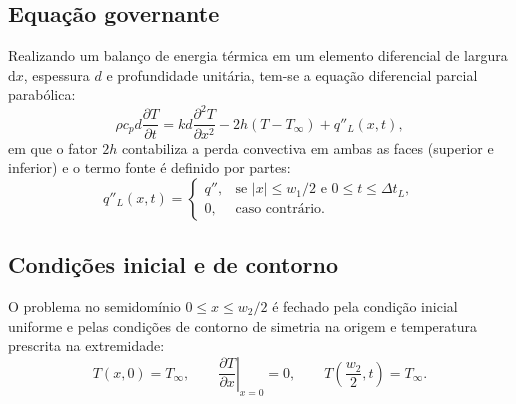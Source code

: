 \documentclass[11pt,a4paper]{article}
\begin{document}
\subsection{Equação governante}
Realizando um balanço de energia térmica em um elemento diferencial de largura $\mathrm{d}x$, espessura $d$ e profundidade unitária, tem-se a equação diferencial parcial parabólica:
\begin{equation}
    \rho c_p d \frac{\partial T}{\partial t} = k d \frac{\partial^2 T}{\partial x^2} - 2h(T - T_\infty) + q''_L(x,t),
    \label{eq:edp_dim}
\end{equation}
em que o fator $2h$ contabiliza a perda convectiva em ambas as faces (superior e inferior) e o termo fonte é definido por partes:
\begin{equation}
    q''_L(x,t) = \begin{cases}
        q'', & \text{se } |x| \le w_1/2 \text{ e } 0 \le t \le \Delta t_L, \\
        0,   & \text{caso contrário.}
    \end{cases}
    \label{eq:fonte_dim}
\end{equation}

\subsection{Condições inicial e de contorno}
O problema no semidomínio $0 \le x \le w_2/2$ é fechado pela condição inicial uniforme e pelas condições de contorno de simetria na origem e temperatura prescrita na extremidade:
\begin{equation}
    T(x,0) = T_\infty, \qquad \left.\frac{\partial T}{\partial x}\right|_{x=0} = 0, \qquad T\!\left(\frac{w_2}{2}, t\right) = T_\infty.
    \label{eq:cc_dim}
\end{equation}
\end{document}
